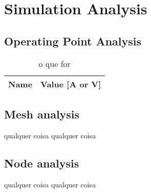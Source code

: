 \section{Simulation Analysis}
\label{sec:simulation}

\subsection{Operating Point Analysis}



\begin{table}[h]
  \centering
  \begin{tabular}{|l|r|}
    \hline    
    {\bf Name} & {\bf Value [A or V]} \\ \hline
    
  \end{tabular}
  \caption{o que for}
  \label{tab:op}
\end{table}


\subsection{Mesh analysis}

qualquer coisa qualquer coisa\\


\subsection{Node analysis}

qualquer coisa qualquer coisa\\

